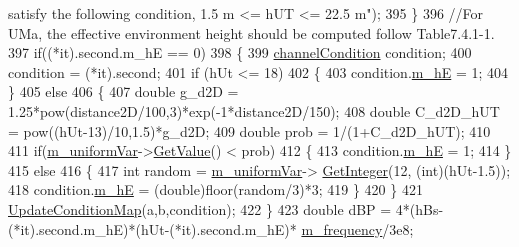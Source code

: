 \begin{DoxyCode}
{       satisfy the following condition, 1.5 m <= hUT <= 22.5 m"});
395                 \}
396                 \textcolor{comment}{//For UMa, the effective environment height should be computed follow Table7.4.1-1.}
397                 \textcolor{keywordflow}{if}((*it).second.m\_hE == 0)
398                 \{
399                         \hyperlink{structchannelCondition}{channelCondition} condition;
400                         condition = (*it).second;
401                         \textcolor{keywordflow}{if} (hUt <= 18)
402                         \{
403                                 condition.\hyperlink{structchannelCondition_a6d2cc3deb0ce073a2b9a4d213e869985}{m\_hE} = 1;
404                         \}
405                         \textcolor{keywordflow}{else}
406                         \{
407                                 \textcolor{keywordtype}{double} g\_d2D = 1.25*pow(distance2D/100,3)*exp(-1*distance2D/150);
408                                 \textcolor{keywordtype}{double} C\_d2D\_hUT = pow((hUt-13)/10,1.5)*g\_d2D;
409                                 \textcolor{keywordtype}{double} prob = 1/(1+C\_d2D\_hUT);
410 
411                                 \textcolor{keywordflow}{if}(\hyperlink{classMmWave3gppPropagationLossModel_a03532a0deaf28490552b0ba27bae9afa}{m\_uniformVar}->\hyperlink{classns3_1_1UniformRandomVariable_a03822d8c86ac51e9aa83bbc73041386b}{GetValue}() < prob)
412                                 \{
413                                         condition.\hyperlink{structchannelCondition_a6d2cc3deb0ce073a2b9a4d213e869985}{m\_hE} = 1;
414                                 \}
415                                 \textcolor{keywordflow}{else}
416                                 \{
417                                         \textcolor{keywordtype}{int} random = \hyperlink{classMmWave3gppPropagationLossModel_a03532a0deaf28490552b0ba27bae9afa}{m\_uniformVar}->
      \hyperlink{classns3_1_1RandomVariableStream_a66cd94e6305ce7f000f1a9ff0fcb9aef}{GetInteger}(12, (\textcolor{keywordtype}{int})(hUt-1.5));
418                                         condition.\hyperlink{structchannelCondition_a6d2cc3deb0ce073a2b9a4d213e869985}{m\_hE} = (double)floor(random/3)*3;
419                                 \}
420                         \}
421                         \hyperlink{classMmWave3gppPropagationLossModel_afe6cc723227bc7bb2f6b8cfd1cd08e6a}{UpdateConditionMap}(a,b,condition);
422                 \}
423                 \textcolor{keywordtype}{double} dBP = 4*(hBs-(*it).second.m\_hE)*(hUt-(*it).second.m\_hE)*
      \hyperlink{classMmWave3gppPropagationLossModel_a2e61a4ea86089b9f974dbbb5180f9c86}{m\_frequency}/3e8;

\end{DoxyCode}
